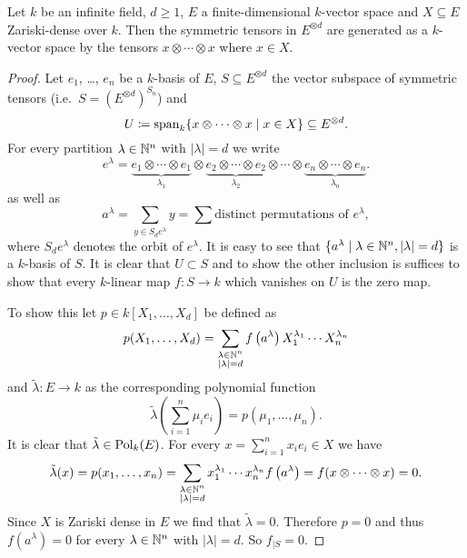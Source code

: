 \begin{lem}\label{lem: symmetric tensors and zariski dense subsets}
  Let $k$ be an infinite field, $d \geq 1$, $E$ a finite-dimensional $k$-vector space and $X \subseteq E$ Zariski-dense over $k$.
  Then the symmetric tensors in $E^{\otimes d}$ are generated as a $k$-vector space by the tensors $x \otimes \dotsb \otimes x$ where $x \in X$.
\end{lem}
\begin{proof}
  Let $e_1$, \dots, $e_n$ be a $k$-basis of $E$, $S \subseteq E^{\otimes d}$ the vector subspace of symmetric tensors (i.e.\ $S = (E^{\otimes d})^{S_n}$) and
  \[
              U
    \coloneqq \operatorname{span}_k \{ x \otimes \dotsb \otimes x \mid x \in X \}
    \subseteq E^{\otimes d}.
  \]
  For every partition $\lambda \in \mathbb{N}^n$ with $|\lambda| = d$ we write
  \[
      e^\lambda
    =         \underbrace{e_1 \otimes \dotsb \otimes e_1}_{\lambda_1}
      \otimes \underbrace{e_2 \otimes \dotsb \otimes e_2}_{\lambda_2}
      \otimes \dotsb
      \otimes \underbrace{e_n \otimes \dotsb \otimes e_n}_{\lambda_n}.
  \]
  as well as
  \[
      a^\lambda
    = \sum_{y \in S_d e^\lambda} y
    = \sum \text{distinct permutations of $e^\lambda$},
  \]
  where $S_d e^\lambda$ denotes the orbit of $e^\lambda$.
  It is easy to see that $\{ a^\lambda \mid \lambda \in \mathbb{N}^n, |\lambda| = d \}$ is a $k$-basis of $S$.
  It is clear that $U \subset S$ and to show the other inclusion is suffices to show that every $k$-linear map $f \colon S \to k$ which vanishes on $U$ is the zero map.
  
  To show this let $p \in k[X_1, \dotsc, X_d]$ be defined as
  \[
      p(X_1, \dotsc, X_d)
    = \sum_{\substack{\lambda \in \mathbb{N}^n \\ |\lambda| = d}}
        f\left( a^\lambda \right)
        X_1^{\lambda_1} \dotsm X_n^{\lambda_n}
  \]
  and $\tilde{\lambda} \colon E \to k$ as the corresponding polynomial function
  \[
      \tilde{\lambda}\left( \sum_{i=1}^n \mu_i e_i \right)
    = p(\mu_1, \dotsc, \mu_n).
  \]
  It is clear that $\tilde{\lambda} \in \operatorname{Pol}_k(E)$.
  For every $x = \sum_{i=1}^n x_i e_i \in X$ we have
  \[
      \tilde{\lambda}(x)
    = p(x_1, \dotsc, x_n)
    = \sum_{\substack{\lambda \in \mathbb{N}^n \\ |\lambda| = d}}
        x_1^{\lambda_1} \dotsm x_n^{\lambda_n}
        f\left( a^\lambda \right) 
    = f(x \otimes \dotsb \otimes x)
    = 0.
  \]
  Since $X$ is Zariski dense in $E$ we find that $\tilde{\lambda} = 0$.
  Therefore $p = 0$ and thus $f(a^\lambda) = 0$ for every $\lambda \in \mathbb{N}^n$ with $|\lambda| = d$.
  So $f_{|S} = 0$.
\end{proof}


